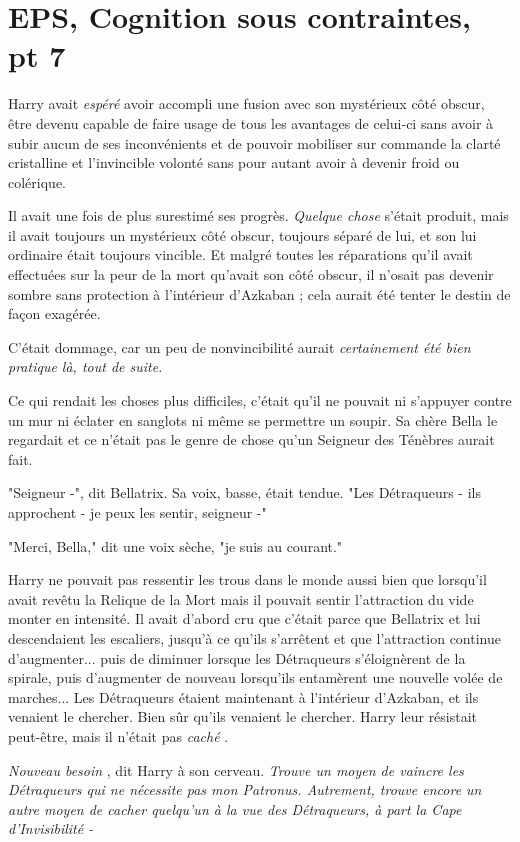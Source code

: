 
\chapter{EPS, Cognition sous contraintes, pt 7}

Harry avait \emph{espéré}  avoir accompli une fusion avec son mystérieux côté obscur, être devenu capable de faire usage de tous les avantages de celui-ci sans avoir à subir aucun de ses inconvénients et de pouvoir mobiliser sur commande la clarté cristalline et l'invincible volonté sans pour autant avoir à devenir froid ou colérique.

Il avait une fois de plus surestimé ses progrès. \emph{Quelque chose}  s'était produit, mais il avait toujours un mystérieux côté obscur, toujours séparé de lui, et son lui ordinaire était toujours vincible. Et malgré toutes les réparations qu'il avait effectuées sur la peur de la mort qu'avait son côté obscur, il n'osait pas devenir sombre sans protection à l'intérieur d'Azkaban ; cela aurait été tenter le destin de façon exagérée.

C'était dommage, car un peu de nonvincibilité aurait \emph{certainement été bien pratique là, tout de suite.} 

Ce qui rendait les choses plus difficiles, c'était qu'il ne pouvait ni s'appuyer contre un mur ni éclater en sanglots ni même se permettre un soupir. Sa chère Bella le regardait et ce n'était pas le genre de chose qu'un Seigneur des Ténèbres aurait fait.

"Seigneur -", dit Bellatrix. Sa voix, basse, était tendue. "Les Détraqueurs - ils approchent - je peux les sentir, seigneur -"

"Merci, Bella," dit une voix sèche, "je suis au courant."

Harry ne pouvait pas ressentir les trous dans le monde aussi bien que lorsqu'il avait revêtu la Relique de la Mort mais il pouvait sentir l'attraction du vide monter en intensité. Il avait d'abord cru que c'était parce que Bellatrix et lui descendaient les escaliers, jusqu'à ce qu'ils s'arrêtent et que l'attraction continue d'augmenter... puis de diminuer lorsque les Détraqueurs s'éloignèrent de la spirale, puis d'augmenter de nouveau lorsqu'ils entamèrent une nouvelle volée de marches... Les Détraqueurs étaient maintenant à l'intérieur d'Azkaban, et ils venaient le chercher. Bien sûr qu'ils venaient le chercher. Harry leur résistait peut-être, mais il n'était pas \emph{caché} .

\emph{Nouveau besoin} , dit Harry à son cerveau. \emph{Trouve un moyen de vaincre les Détraqueurs qui ne nécessite pas mon Patronus. Autrement, trouve encore un autre moyen de cacher quelqu'un à la vue des Détraqueurs, à part la Cape d'Invisibilité -} 

